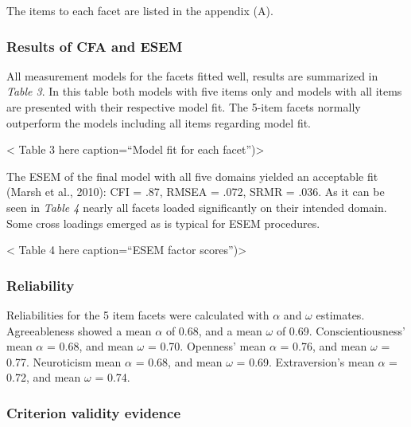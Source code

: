\documentclass[,man,floatsintext]{apa6}
\begin{document}
The items to each facet are listed in the appendix (A).

\subsubsection{Results of CFA and ESEM}\label{results-of-cfa-and-esem}

All measurement models for the facets fitted well, results are
summarized in \emph{Table 3}. In this table both models with five items
only and models with all items are presented with their respective model
fit. The 5-item facets normally outperform the models including all
items regarding model fit.

\vspace{5mm}

\textless{} Table 3 here caption=\enquote{Model fit for each
facet})\textgreater{}

\vspace{5mm}

The ESEM of the final model with all five domains yielded an acceptable
fit (Marsh et al., 2010): CFI = .87, RMSEA = .072, SRMR = .036. As it
can be seen in \emph{Table 4} nearly all facets loaded significantly on
their intended domain. Some cross loadings emerged as is typical for
ESEM procedures.

\vspace{5mm}

\textless{} Table 4 here caption=\enquote{ESEM factor
scores})\textgreater{}

\vspace{5mm}

\subsubsection{Reliability}\label{reliability-1}

Reliabilities for the 5 item facets were calculated with \(\alpha\) and
\(\omega\) estimates. Agreeableness showed a mean \(\alpha\) of 0.68,
and a mean \(\omega\) of 0.69. Conscientiousness' mean \(\alpha\) =
0.68, and mean \(\omega\) = 0.70. Openness' mean \(\alpha\) = 0.76, and
mean \(\omega\) = 0.77. Neuroticism mean \(\alpha\) = 0.68, and mean
\(\omega\) = 0.69. Extraversion's mean \(\alpha\) = 0.72, and mean
\(\omega\) = 0.74.

\subsubsection{Criterion validity
evidence}\label{criterion-validity-evidence-1}
\end{document}
